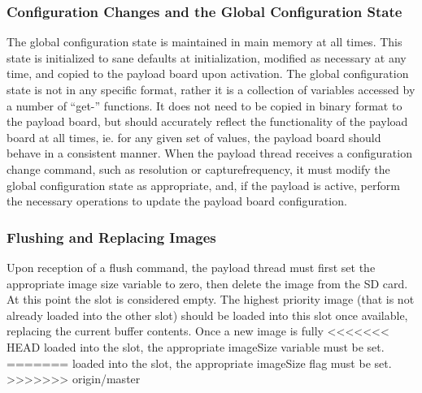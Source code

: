 \documentclass[10pt]{extarticle}
\begin{document}
\subsubsection{Configuration Changes and the Global Configuration State}
The global configuration state is maintained in main memory at all times. 
This state is initialized to sane
defaults at initialization, modified as necessary at any time, and copied
to the payload board upon activation. 
The global configuration state is not in any specific format, rather it is
a collection of variables accessed by a number of ``get-'' functions. It does
not need to be copied in binary format to the payload board, but should
accurately reflect the functionality of the payload board at all times, ie. for
any given set of values, the payload board should behave in a consistent manner.
When the payload thread receives a configuration change command, such as resolution
or capturefrequency, it must modify the global configuration state as
appropriate, and, if the payload is active, perform the necessary operations
to update the payload board configuration.

\subsubsection{Flushing and Replacing Images}
Upon reception of a flush command, the payload thread must first set the
appropriate image size variable to zero, then delete the image
from the SD card. At this point the slot is
considered empty. The highest priority image (that is not already loaded into
the other slot) should be loaded into this slot
once available, replacing the current buffer contents. Once a new image is fully
<<<<<<< HEAD
loaded into the slot, the appropriate imageSize variable must be set.
=======
loaded into the slot, the appropriate imageSize flag must be set.
>>>>>>> origin/master
\end{document}
